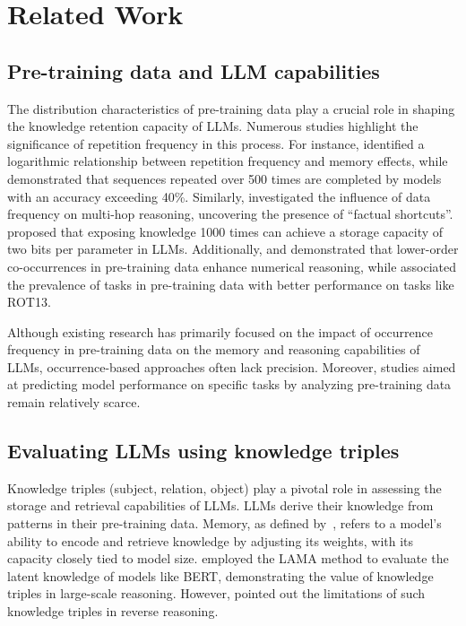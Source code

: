 \section{Related Work}
\label{relatework}

\subsection{Pre-training data and LLM capabilities}
The distribution characteristics of pre-training data play a crucial role in shaping the knowledge retention capacity of LLMs. Numerous studies highlight the significance of repetition frequency in this process. For instance, \citet{DBLP:conf/iclr/CarliniIJLTZ23} identified a logarithmic relationship between repetition frequency and memory effects, while \citet{DBLP:journals/jmlr/ChowdheryNDBMRBCSGSSTMRBTSPRDHPBAI23} demonstrated that sequences repeated over 500 times are completed by models with an accuracy exceeding 40\%. Similarly, \citet{DBLP:conf/acl/JuCY0DZL24} investigated the influence of data frequency on multi-hop reasoning, uncovering the presence of ``factual shortcuts''. \citet{DBLP:journals/corr/abs-2404-05405} proposed that exposing knowledge 1000 times can achieve a storage capacity of two bits per parameter in LLMs. Additionally, \citet{DBLP:conf/emnlp/RazeghiL0022} and \citet{DBLP:journals/corr/abs-2311-00871} demonstrated that lower-order co-occurrences in pre-training data enhance numerical reasoning, while \citet{DBLP:journals/corr/abs-2309-13638} associated the prevalence of tasks in pre-training data with better performance on tasks like ROT13.

Although existing research has primarily focused on the impact of occurrence frequency in pre-training data on the memory and reasoning capabilities of LLMs, occurrence-based approaches often lack precision. Moreover, studies aimed at predicting model performance on specific tasks by analyzing pre-training data remain relatively scarce.


\subsection{Evaluating LLMs using knowledge triples}
Knowledge triples (subject, relation, object) play a pivotal role in assessing the storage and retrieval capabilities of LLMs. LLMs derive their knowledge from patterns in their pre-training data. Memory, as defined by~\cite{DBLP:journals/corr/abs-2403-00510}, refers to a model’s ability to encode and retrieve knowledge by adjusting its weights, with its capacity closely tied to model size. \citet{DBLP:conf/emnlp/PetroniRRLBWM19} employed the LAMA method to evaluate the latent knowledge of models like BERT, demonstrating the value of knowledge triples in large-scale reasoning. However, \citet{DBLP:journals/corr/abs-2402-14273} pointed out the limitations of such knowledge triples in reverse reasoning.

